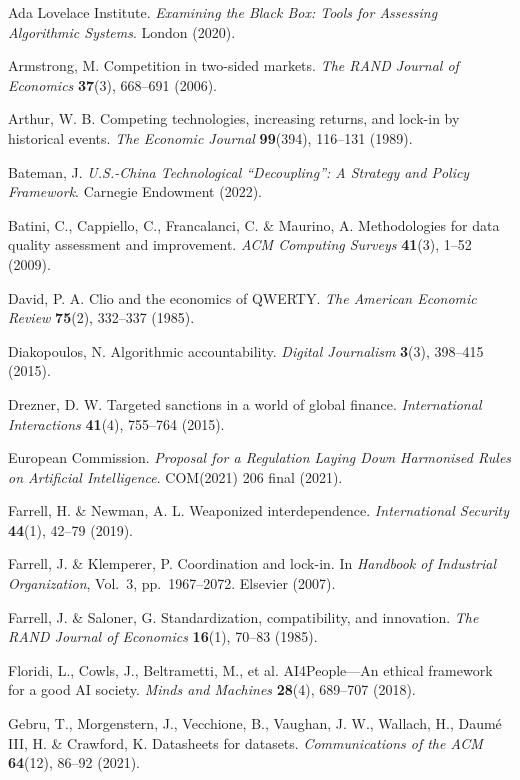 \documentclass[12pt,a4paper]{ctexart}
\theoremstyle{definition}
\theoremstyle{remark}
\begin{document}
 Ada Lovelace Institute. \textit{Examining the Black Box: Tools for Assessing Algorithmic Systems}. London (2020).

 Armstrong, M. Competition in two-sided markets. \textit{The RAND Journal of Economics} \textbf{37}(3), 668--691 (2006).

 Arthur, W. B. Competing technologies, increasing returns, and lock-in by historical events. \textit{The Economic Journal} \textbf{99}(394), 116--131 (1989).

 Bateman, J. \textit{U.S.-China Technological ``Decoupling'': A Strategy and Policy Framework}. Carnegie Endowment (2022).

 Batini, C., Cappiello, C., Francalanci, C. \& Maurino, A. Methodologies for data quality assessment and improvement. \textit{ACM Computing Surveys} \textbf{41}(3), 1--52 (2009).

 David, P. A. Clio and the economics of QWERTY. \textit{The American Economic Review} \textbf{75}(2), 332--337 (1985).

 Diakopoulos, N. Algorithmic accountability. \textit{Digital Journalism} \textbf{3}(3), 398--415 (2015).

 Drezner, D. W. Targeted sanctions in a world of global finance. \textit{International Interactions} \textbf{41}(4), 755--764 (2015).

 European Commission. \textit{Proposal for a Regulation Laying Down Harmonised Rules on Artificial Intelligence}. COM(2021) 206 final (2021).

 Farrell, H. \& Newman, A. L. Weaponized interdependence. \textit{International Security} \textbf{44}(1), 42--79 (2019).

 Farrell, J. \& Klemperer, P. Coordination and lock-in. In \textit{Handbook of Industrial Organization}, Vol.~3, pp.~1967--2072. Elsevier (2007).

 Farrell, J. \& Saloner, G. Standardization, compatibility, and innovation. \textit{The RAND Journal of Economics} \textbf{16}(1), 70--83 (1985).

 Floridi, L., Cowls, J., Beltrametti, M., et al. AI4People---An ethical framework for a good AI society. \textit{Minds and Machines} \textbf{28}(4), 689--707 (2018).

 Gebru, T., Morgenstern, J., Vecchione, B., Vaughan, J. W., Wallach, H., Daum\'e III, H. \& Crawford, K. Datasheets for datasets. \textit{Communications of the ACM} \textbf{64}(12), 86--92 (2021).
\end{document}
